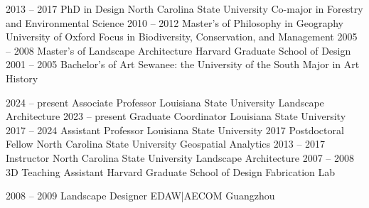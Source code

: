 \documentclass[10pt]{developercv}
\begin{document}
\vspace*{-0.2cm}

\begin{entrylist}
	\entry
		{2013 -- 2017}
		{PhD in Design}
		{North Carolina State University}
		{Co-major in Forestry and Environmental Science}
	\entry
		{2010 -- 2012}
		{Master's of Philosophy in Geography} %
		{University of Oxford}
		{Focus in Biodiversity, Conservation, and Management}
	\entry
		{2005 -- 2008}
		{Master's of Landscape Architecture}
		{Harvard Graduate School of Design}
		{\vspace*{-1em}}
	\entry
		{2001 -- 2005}
		{Bachelor's of Art}
		{Sewanee: the University of the South}
		{Major in Art History}
\end{entrylist}


\vspace*{-0.3cm}

\begin{entrylist}
	\entry
		{2024 -- present}
		{Associate Professor}
		{Louisiana State University}
		{Landscape Architecture}
	\entry
		{2023 -- present}
		{Graduate Coordinator}
		{Louisiana State University}
		{\vspace*{-1em}}
	\entry
		{2017 -- 2024}
		{Assistant Professor}
		{Louisiana State University}
		{\vspace*{-1em}}
	\entry
		{2017}
		{Postdoctoral Fellow}
		{North Carolina State University}
		{Geospatial Analytics}
	\entry
		{2013 -- 2017}
		{Instructor}
		{North Carolina State University}
		{Landscape Architecture}
	\entry
		{2007 -- 2008}
		{3D Teaching Assistant}
		{Harvard Graduate School of Design}
		{Fabrication Lab}
\end{entrylist}

\vspace*{-0.4cm}

\begin{entrylist}
	\entry
		{2008 -- 2009}
		{Landscape Designer}
		{EDAW|AECOM Guangzhou}
		{}
\end{entrylist}

\end{document}
